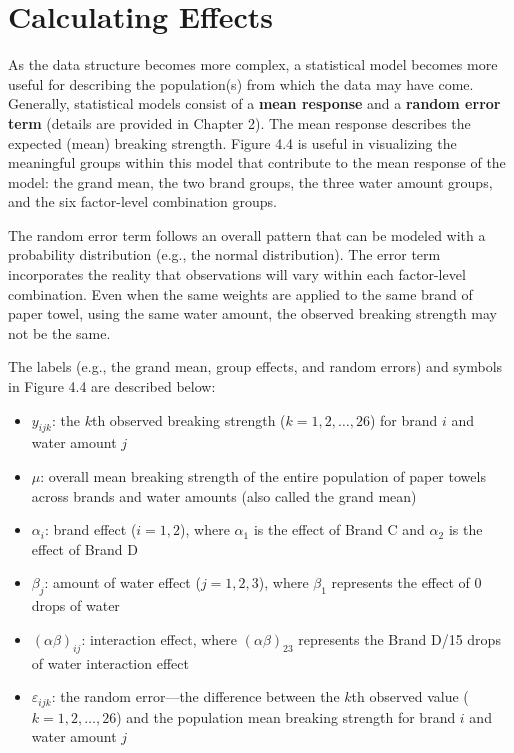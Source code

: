 \documentclass[
]{report}
\providecommand{\tightlist}{%
  \setlength{\itemsep}{0pt}\setlength{\parskip}{0pt}}
\begin{document}
\section{Calculating Effects}\label{calculating-effects}

As the data structure becomes more complex, a statistical model becomes more useful for describing the population(s) from which the data may have come. Generally, statistical models consist of a \textbf{mean response} and a \textbf{random error term} (details are provided in Chapter 2). The mean response describes the expected (mean) breaking strength. Figure 4.4 is useful in visualizing the meaningful groups within this model that contribute to the mean response of the model: the grand mean, the two brand groups, the three water amount groups, and the six factor-level combination groups.

The random error term follows an overall pattern that can be modeled with a probability distribution (e.g., the normal distribution). The error term incorporates the reality that observations will vary within each factor-level combination. Even when the same weights are applied to the same brand of paper towel, using the same water amount, the observed breaking strength may not be the same.

The labels (e.g., the grand mean, group effects, and random errors) and symbols in Figure 4.4 are described below:

\begin{itemize}
\tightlist
\item
  \(y_{ijk}\): the \(k\)th observed breaking strength (\(k = 1, 2, \dots, 26\)) for brand \(i\) and water amount \(j\)\\
\item
  \(\mu\): overall mean breaking strength of the entire population of paper towels across brands and water amounts (also called the grand mean)\\
\item
  \(\alpha_i\): brand effect (\(i = 1, 2\)), where \(\alpha_1\) is the effect of Brand C and \(\alpha_2\) is the effect of Brand D\\
\item
  \(\beta_j\): amount of water effect (\(j = 1, 2, 3\)), where \(\beta_1\) represents the effect of 0 drops of water\\
\item
  \((\alpha\beta)_{ij}\): interaction effect, where \((\alpha\beta)_{23}\) represents the Brand D/15 drops of water interaction effect\\
\item
  \(\varepsilon_{ijk}\): the random error---the difference between the \(k\)th observed value (\(k = 1, 2, \dots, 26\)) and the population mean breaking strength for brand \(i\) and water amount \(j\)
\end{itemize}
\end{document}
